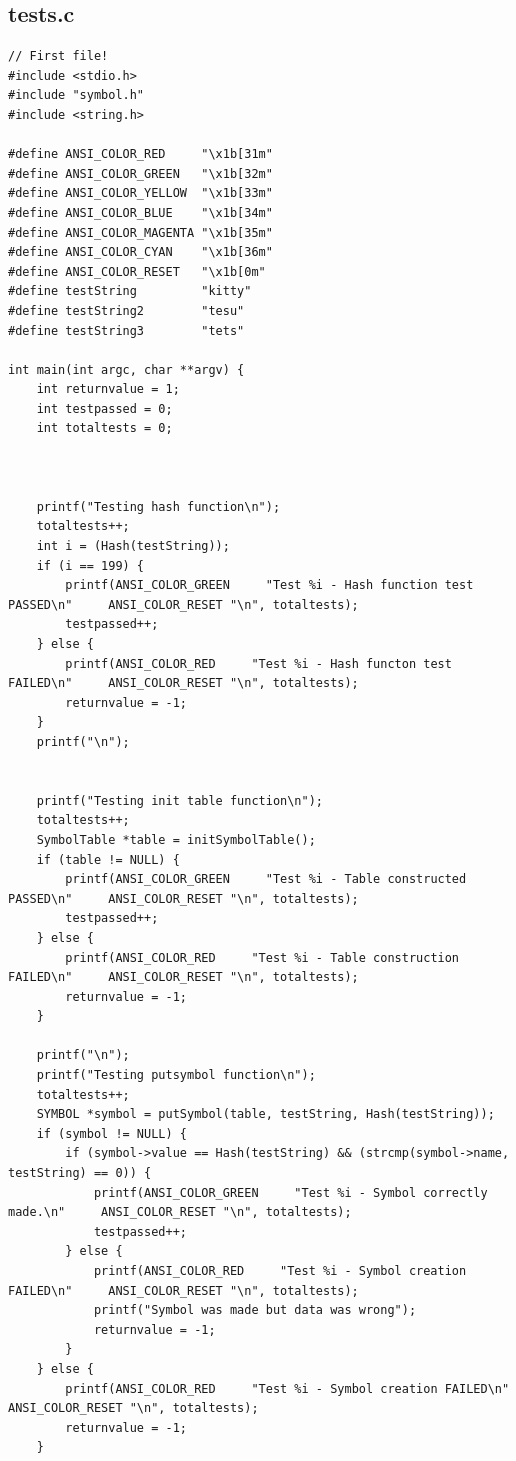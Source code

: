\documentclass[a4paper,10pt,titlepage]{report}
\begin{document}
\subsection{tests.c}
\begin{lstlisting}
// First file!
#include <stdio.h>
#include "symbol.h"
#include <string.h>

#define ANSI_COLOR_RED     "\x1b[31m"
#define ANSI_COLOR_GREEN   "\x1b[32m"
#define ANSI_COLOR_YELLOW  "\x1b[33m"
#define ANSI_COLOR_BLUE    "\x1b[34m"
#define ANSI_COLOR_MAGENTA "\x1b[35m"
#define ANSI_COLOR_CYAN    "\x1b[36m"
#define ANSI_COLOR_RESET   "\x1b[0m"
#define testString         "kitty"
#define testString2        "tesu"
#define testString3        "tets"

int main(int argc, char **argv) {
    int returnvalue = 1;
    int testpassed = 0;
    int totaltests = 0;



    printf("Testing hash function\n");
    totaltests++;
    int i = (Hash(testString));
    if (i == 199) {
        printf(ANSI_COLOR_GREEN     "Test %i - Hash function test PASSED\n"     ANSI_COLOR_RESET "\n", totaltests);
        testpassed++;
    } else {
        printf(ANSI_COLOR_RED     "Test %i - Hash functon test FAILED\n"     ANSI_COLOR_RESET "\n", totaltests);
        returnvalue = -1;
    }
    printf("\n");


    printf("Testing init table function\n");
    totaltests++;
    SymbolTable *table = initSymbolTable();
    if (table != NULL) {
        printf(ANSI_COLOR_GREEN     "Test %i - Table constructed PASSED\n"     ANSI_COLOR_RESET "\n", totaltests);
        testpassed++;
    } else {
        printf(ANSI_COLOR_RED     "Test %i - Table construction FAILED\n"     ANSI_COLOR_RESET "\n", totaltests);
        returnvalue = -1;
    }

    printf("\n");
    printf("Testing putsymbol function\n");
    totaltests++;
    SYMBOL *symbol = putSymbol(table, testString, Hash(testString));
    if (symbol != NULL) {
        if (symbol->value == Hash(testString) && (strcmp(symbol->name, testString) == 0)) {
            printf(ANSI_COLOR_GREEN     "Test %i - Symbol correctly made.\n"     ANSI_COLOR_RESET "\n", totaltests);
            testpassed++;
        } else {
            printf(ANSI_COLOR_RED     "Test %i - Symbol creation FAILED\n"     ANSI_COLOR_RESET "\n", totaltests);
            printf("Symbol was made but data was wrong");
            returnvalue = -1;
        }
    } else {
        printf(ANSI_COLOR_RED     "Test %i - Symbol creation FAILED\n"     ANSI_COLOR_RESET "\n", totaltests);
        returnvalue = -1;
    }


\end{lstlisting}
\end{document}
